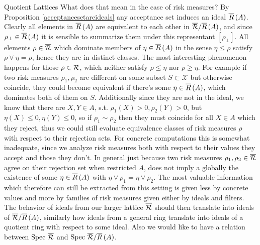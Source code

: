 \begin{subsection}{Quotient Lattices}
    What does that mean in the case of risk measures?
    By Proposition \ref{acceptancesetareideals} any acceptance set induces an ideal \( \overline{R}\left (A \right) \).
    Clearly all elements in \( \overline{R}\left (A \right) \) are equivalent to each other in \( \overline{\mathcal{R}} / \overline{R}\left (A \right) \),
    and since \( \rho_\bot \in \overline{R}\left (A \right) \) it is sensible to summarize them under this representant \( [ \rho_\bot ] \).
    All elements \( \rho \in \overline{\mathcal{R}} \) which dominate members of \( \eta \in \overline{R}\left (A \right) \) in the sense \( \eta \leq \rho \)
    satisfy \( \rho \vee \eta = \rho \), hence they are in distinct classes.
    The most interesting phenomenon happens for those \( \rho \in \overline{\mathcal{R}} \), which neither satisfy \( \rho \leq \eta \)
    nor \( \rho \geq \eta \). For example if two risk measures \( \rho_1, \rho_2 \) are different on some subset \( S \subset \mathcal{X} \)
    but otherwise coincide, they could become equivalent if there's some \( \eta \in \overline{R}\left (A \right) \), which dominates both of them on \( S \).
    Additionally since they are not in the ideal, we know that there are \( X, Y \in A \), s.t. \( \rho_1(X) > 0, \rho_2(Y) > 0 \),
    but \( \eta(X) \leq 0, \eta(Y) \leq 0 \), so if \( \rho_1 \sim \rho_2 \) then they must coincide for all \( X \in A \) which they
    reject, thus we could still evaluate equivalence classes of risk measures \( \rho \) with respect to their rejection sets.
    \newline
    For concrete computations this is somewhat inadequate, since we analyze risk measures both with respect to their values they accept and those
    they don't. In general just because two risk measures \( \rho_1, \rho_2 \in \overline{\mathcal{R}} \) agree on their rejection set when restricted \( A \), 
    does not imply a globally the existence of some \( \eta \in \overline{R}\left (A \right) \) with \( \eta \vee \rho_1 = \eta \vee \rho_2 \). 
    The most valuable information which therefore can still be extracted from this setting is given less by concrete values and more by families
    of risk measures given either by ideals and filters.
    \newline
    \newline
    The behavior of ideals from our larger lattice \( \overline{\mathcal{R}} \) should then translate into ideals of \( \overline{\mathcal{R}} / \overline{R}\left (A \right) \), similarly
    how ideals from a general ring translate into ideals of a quotient ring with respect to some ideal.
    Also we would like to have a relation between \( \text{Spec } \overline{\mathcal{R}} \) and \( \text{Spec } \overline{\mathcal{R}} / \overline{R}\left (A \right)\).

\end{subsection}
